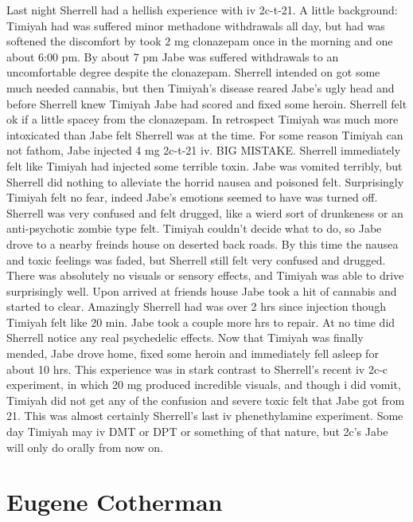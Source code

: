 \documentclass[12pt]{book}
\begin{document}
Last night Sherrell had a hellish experience with iv 2c-t-21. A little background: Timiyah had was suffered minor methadone withdrawals all day, but had was softened the discomfort by took 2 mg clonazepam once in the morning and one about 6:00 pm. By about 7 pm Jabe was suffered withdrawals to an uncomfortable degree despite the clonazepam. Sherrell intended on got some much needed cannabis, but then Timiyah's disease reared Jabe's ugly head and before Sherrell knew Timiyah Jabe had scored and fixed some heroin. Sherrell felt ok if a little spacey from the clonazepam. In retrospect Timiyah was much more intoxicated than Jabe felt Sherrell was at the time. For some reason Timiyah can not fathom, Jabe injected 4 mg 2c-t-21 iv. BIG MISTAKE. Sherrell immediately felt like Timiyah had injected some terrible toxin. Jabe was vomited terribly, but Sherrell did nothing to alleviate the horrid nausea and poisoned felt. Surprisingly Timiyah felt no fear, indeed Jabe's emotions seemed to have was turned off. Sherrell was very confused and felt drugged, like a wierd sort of drunkeness or an anti-psychotic zombie type felt. Timiyah couldn't decide what to do, so Jabe drove to a nearby freinds house on deserted back roads. By this time the nausea and toxic feelings was faded, but Sherrell still felt very confused and drugged. There was absolutely no visuals or sensory effects, and Timiyah was able to drive surprisingly well. Upon arrived at friends house Jabe took a hit of cannabis and started to clear. Amazingly Sherrell had was over 2 hrs since injection though Timiyah felt like 20 min. Jabe took a couple more hrs to repair. At no time did Sherrell notice any real psychedelic effects. Now that Timiyah was finally mended, Jabe drove home, fixed some heroin and immediately fell asleep for about 10 hrs. This experience was in stark contrast to Sherrell's recent iv 2c-c experiment, in which 20 mg produced incredible visuals, and though i did vomit, Timiyah did not get any of the confusion and severe toxic felt that Jabe got from 21. This was almost certainly Sherrell's last iv phenethylamine experiment. Some day Timiyah may iv DMT or DPT or something of that nature, but 2c's Jabe will only do orally from now on.






\chapter{Eugene Cotherman}
\end{document}
